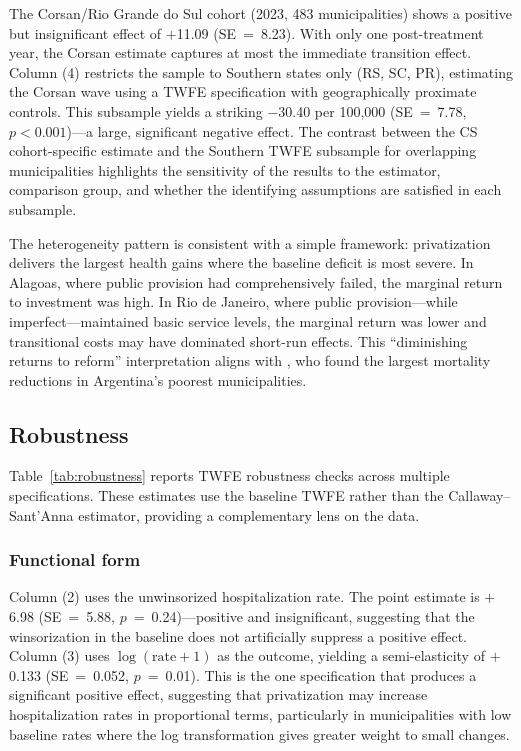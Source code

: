 \documentclass[12pt]{article}
\begin{document}
The Corsan/Rio Grande do Sul cohort (2023, 483 municipalities) shows a positive but insignificant effect of $+$11.09 (SE~=~8.23). With only one post-treatment year, the Corsan estimate captures at most the immediate transition effect. Column (4) restricts the sample to Southern states only (RS, SC, PR), estimating the Corsan wave using a TWFE specification with geographically proximate controls. This subsample yields a striking $-$30.40 per 100,000 (SE~=~7.78, $p<0.001$)---a large, significant negative effect. The contrast between the CS cohort-specific estimate and the Southern TWFE subsample for overlapping municipalities highlights the sensitivity of the results to the estimator, comparison group, and whether the identifying assumptions are satisfied in each subsample.

The heterogeneity pattern is consistent with a simple framework: privatization delivers the largest health gains where the baseline deficit is most severe. In Alagoas, where public provision had comprehensively failed, the marginal return to investment was high. In Rio de Janeiro, where public provision---while imperfect---maintained basic service levels, the marginal return was lower and transitional costs may have dominated short-run effects. This ``diminishing returns to reform'' interpretation aligns with \citet{galiani2005water}, who found the largest mortality reductions in Argentina's poorest municipalities.

\subsection{Robustness}



Table~\ref{tab:robustness} reports TWFE robustness checks across multiple specifications. These estimates use the baseline TWFE rather than the Callaway--Sant'Anna estimator, providing a complementary lens on the data.

\subsubsection*{Functional form} Column (2) uses the unwinsorized hospitalization rate. The point estimate is $+$6.98 (SE~=~5.88, $p$~=~0.24)---positive and insignificant, suggesting that the winsorization in the baseline does not artificially suppress a positive effect. Column (3) uses $\log(\text{rate} + 1)$ as the outcome, yielding a semi-elasticity of $+$0.133 (SE~=~0.052, $p$~=~0.01). This is the one specification that produces a significant positive effect, suggesting that privatization may increase hospitalization rates in proportional terms, particularly in municipalities with low baseline rates where the log transformation gives greater weight to small changes.
\end{document}
